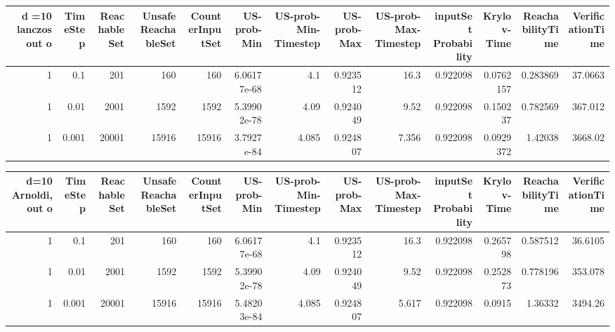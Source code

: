 \begin{tabular}{rrrrrrrrrrrrr}
\hline d =10 lanczos out
   o &   TimeStep &   ReachableSet &   UnsafeReachableSet &   CounterInputSet &   US-prob-Min &   US-prob-Min-Timestep &   US-prob-Max &   US-prob-Max-Timestep &   inputSet Probability &   Krylov-Time &   ReachabilityTime &   VerificationTime \\
\hline
   1 &       0.1  &            201 &                  160 &               160 &   6.06177e-68 &                   4.1  &      0.923512 &                  16.3  &               0.922098 &     0.0762157 &           0.283869 &            37.0663 \\
   1 &       0.01 &           2001 &                 1592 &              1592 &   5.39902e-78 &                   4.09 &      0.924049 &                   9.52 &               0.922098 &     0.150237  &           0.782569 &           367.012  \\
   1 &      0.001 &          20001 &                15916 &             15916 &    3.7927e-84 &                  4.085 &      0.924807 &                  7.356 &               0.922098 &     0.0929372 &            1.42038 &            3668.02 \\
\hline
\end{tabular}
\begin{tabular}{rrrrrrrrrrrrr}
\hline d=10 Arnoldi, out
   o &   TimeStep &   ReachableSet &   UnsafeReachableSet &   CounterInputSet &   US-prob-Min &   US-prob-Min-Timestep &   US-prob-Max &   US-prob-Max-Timestep &   inputSet Probability &   Krylov-Time &   ReachabilityTime &   VerificationTime \\
\hline
   1 &      0.1   &            201 &                  160 &               160 &   6.06177e-68 &                  4.1   &      0.923512 &                 16.3   &               0.922098 &      0.265798 &           0.587512 &            36.6105 \\
   1 &      0.01  &           2001 &                 1592 &              1592 &   5.39902e-78 &                  4.09  &      0.924049 &                  9.52  &               0.922098 &      0.252873 &           0.778196 &           353.078  \\
   1 &      0.001 &          20001 &                15916 &             15916 &   5.48203e-84 &                  4.085 &      0.924807 &                  5.617 &               0.922098 &      0.0915   &           1.36332  &          3494.26   \\
\hline
\end{tabular}

